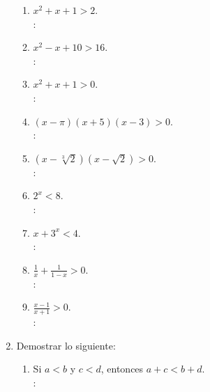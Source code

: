 \begin{enumerate}
\begin{enumerate}[label=\roman*.]
        \item $ x^2 + x + 1 > 2 $. \\
        \solucion: \\
        
        \item $ x^2 - x + 10 > 16  $. \\
        \solucion: \\
        
        \item $ x^2 + x + 1 > 0 $. \\
        \solucion: \\
        
        \item $ (x - \pi)(x + 5)(x - 3) > 0 $. \\
        \solucion: \\
        
        \item $ (x - \sqrt[3]{2})(x-\sqrt{2}) > 0 $. \\
        \solucion: \\
        
        \item $ 2^x < 8 $. \\
        \solucion: \\
        
        \item $ x + 3^x < 4 $. \\
        \solucion: \\
        
        \item $ \frac{1}{x} + \frac{1}{1-x} > 0 $. \\
        \solucion: \\
        
        \item $ \frac{x-1}{x+1} > 0 $. \\
        \solucion: \\
        
    \end{enumerate}
    
    \item Demostrar lo siguiente:
    \begin{enumerate}[label=\roman*]
        \item Si $ a < b $ y $ c < d $, entonces $ a + c < b + d $. \\
        \solucion: \\
        

\end{enumerate}
\end{enumerate}
